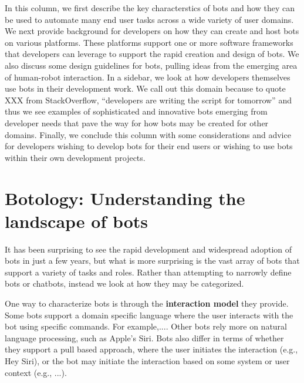 \documentclass{sig-alternate}
\begin{document}
In this column, we first describe the key characterstics of bots and how they can be used to automate many end user tasks across a wide variety of user domains.  
We next provide background for developers on how they can create and host bots on various platforms. These platforms support one or more software frameworks that developers can leverage to support the rapid creation and design of bots. We also discuss some design guidelines for bots, pulling ideas from the emerging area of human-robot interaction. 
In a sidebar, we look at how developers themselves use bots in their development work.  We call out this domain because to quote XXX from StackOverflow, ``developers are writing the script for tomorrow'' and thus we see examples of sophisticated and innovative bots emerging from developer needs that pave the way for how bots may be created for other domains.
Finally, we conclude this column with some considerations and advice for developers wishing to develop bots for their end users or wishing to use bots within their own development projects.   


 
	

	
	
%	

\section{Botology: Understanding the landscape of bots}



It has been surprising to see the rapid development and widespread adoption of bots in just a few years, but what is more surprising is the vast array of bots that support a variety of tasks and roles.  
Rather than attempting to narrowly define bots or chatbots, instead we look at how they may be categorized. 

One way to characterize bots is through the \textbf{interaction model} they provide. 
Some bots support a domain specific language where the user interacts with the bot using specific commands.  For example,.... 
Other bots rely more on natural language processing, such as Apple's Siri.
Bots also differ in terms of whether they support a pull based approach, where the user initiates the interaction (e.g., Hey Siri), or the bot may initiate the interaction based on some system or user context (e.g., ...). 
\end{document}
